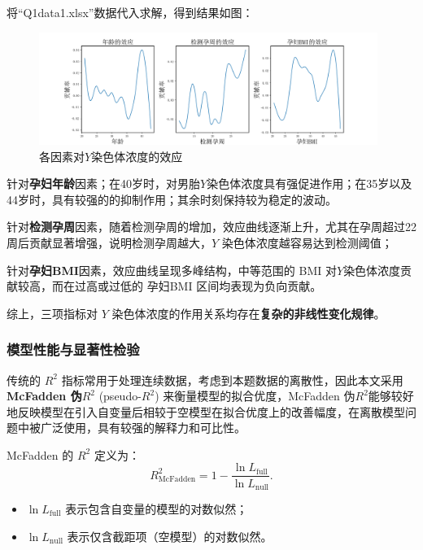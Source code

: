 \documentclass[12pt]{ctexart}
\begin{document}
	将“Q1data1.xlsx”数据代入求解，得到结果如图：
	\begin{figure}[htbp]
		\centering
		\includegraphics[width=0.98\textwidth]{gam.png} %
		\caption{各因素对$Y$染色体浓度的效应}
	\end{figure}
	
	针对\textbf{孕妇年龄}因素；在40岁时，对男胎$Y$染色体浓度具有强促进作用；在35岁以及44岁时，具有较强的的抑制作用；其余时刻保持较为稳定的波动。
	
	针对\textbf{检测孕周}因素，随着检测孕周的增加，效应曲线逐渐上升，尤其在孕周超过22周后贡献显著增强，说明检测孕周越大，$Y$ 染色体浓度越容易达到检测阈值；
	
	针对\textbf{孕妇BMI}因素，效应曲线呈现多峰结构，中等范围的 BMI 对$Y$染色体浓度贡献较高，而在过高或过低的 孕妇BMI 区间均表现为负向贡献。
	
	综上，三项指标对 $Y$ 染色体浓度的作用关系均存在\textbf{复杂的非线性变化规律}。
	
	\subsubsection{模型性能与显著性检验}
	
	传统的 $R^2$ 指标常用于处理连续数据，考虑到本题数据的离散性，因此本文采用\textbf{McFadden 伪$R^2$} (pseudo-$R^2$) 来衡量模型的拟合优度，McFadden 伪$R^2$能够较好地反映模型在引入自变量后相较于空模型在拟合优度上的改善幅度，在离散模型问题中被广泛使用，具有较强的解释力和可比性。
	
	McFadden 的 $R^2$ 定义为：
	\begin{equation}
		R^2_{\text{McFadden}} = 1 - \frac{\ln L_{\text{full}}}{\ln L_{\text{null}}}.
	\end{equation}
\begin{itemize}[noitemsep, topsep=0pt, parsep=0pt, partopsep=0pt, leftmargin=1.5em]
	\item \(\ln L_{\text{full}}\) 表示包含自变量的模型的对数似然；
	\item \(\ln L_{\text{null}}\) 表示仅含截距项（空模型）的对数似然。
\end{itemize}
\end{document}
